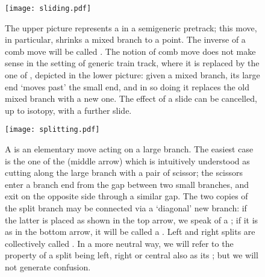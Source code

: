 \begin{figure}
\begin{center}
\def\svgwidth{.7\textwidth}


\vspace{1ex}\texttt{[image: sliding.pdf]}
\end{center}
\caption{\label{fig:ttcombing}The upper picture represents a  in a semigeneric pretrack; this move, in particular, shrinks a mixed branch to a point. The inverse of a comb move will be called . The notion of comb move does not make sense in the setting of generic train track, where it is replaced by the one of , depicted in the lower picture: given a mixed branch, its large end `moves past' the small end, and in so doing it replaces the old mixed branch with a new one. The effect of a slide can be cancelled, up to isotopy, with a further slide.}
\end{figure}
\begin{figure}
\begin{center}
\def\svgwidth{.7\textwidth}
\vspace{1ex}\texttt{[image: splitting.pdf]}
\end{center}
\caption{\label{fig:ttsplitting} A  is an elementary move acting on a large branch. The easiest case is the one of the  (middle arrow) which is intuitively understood as cutting along the large branch with a pair of scissor; the scissors enter a branch end from the gap between two small branches, and exit on the opposite side through a similar gap. The two copies of the split branch may be connected via a `diagonal' new branch: if the latter is placed as shown in the top arrow, we speak of a ; if it is as in the bottom arrow, it will be called a . Left and right splits are collectively called . In a more neutral way, we will refer to the property of a split being left, right or central also as its ; but we will not generate confusion.}
\end{figure}

